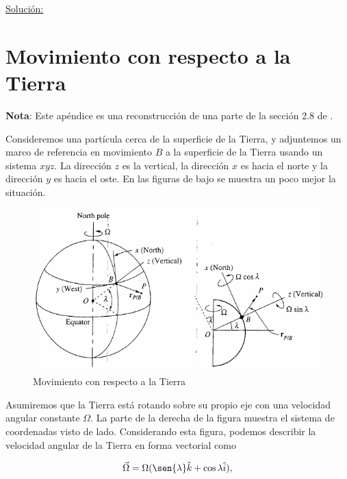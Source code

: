 \documentclass[a4paper,10pt]{article}
\numberwithin{equation}{section}
\begin{document}
\vspace{.3cm}

\underline{Solución:} \vspace{.3cm}

\appendix
\appendixpage

\section{Movimiento con respecto a la Tierra}

\textbf{Nota}: Este apéndice es una reconstrucción de una parte de la sección 2.8 
de \cite{baruh}. 

\vspace{.3cm}

Consideremos una partícula cerca de la superficie de la Tierra, y adjuntemos un marco 
de referencia en movimiento $B$ a la superficie de la Tierra usando un sistema 
$xyz$. La dirección $z$ es la vertical, la dirección $x$ es hacia el norte y la 
dirección $y$ es hacia el oste. En las figuras de bajo se muestra un poco mejor 
la situación.

\begin{figure}[H]
 \center
 \includegraphics[scale=0.4]{apendice1fig1}
 \caption{Movimiento con respecto a la Tierra}
  \label{fig:apendice1fig1}
\end{figure}

Asumiremos que la Tierra está rotando sobre su propio eje con una velocidad angular 
constante $\Omega$. La parte de la derecha de la figura  
muestra el sistema de coordenadas visto de lado. Considerando esta figura, podemos 
describir la velocidad angular de la Tierra en forma vectorial como

\begin{equation}
 \vec{\Omega} = \Omega(\sen{\lambda}\hat{k}+\cos{\lambda}\hat{i}),
 \label{eq:velAngTierra1}
\end{equation}
\end{document}
